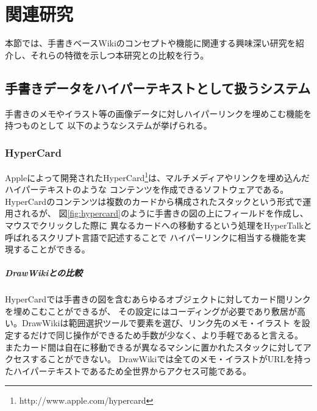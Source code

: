\chapter{関連研究}
\label{chap:kanren}

本節では、手書きベースWikiのコンセプトや機能に関連する興味深い研究を紹介し、それらの特徴を示しつ本研究との比較を行う。
\newpage


%

\section{手書きデータをハイパーテキストとして扱うシステム}
\label{hyperillustcreators}
手書きのメモやイラスト等の画像データに対しハイパーリンクを埋めこむ機能を持つものとして
以下のようなシステムが挙げられる。

\subsection{HyperCard}
Appleによって開発されたHyperCard\footnote{http://www.apple.com/hypercard}は、マルチメディアやリンクを埋め込んだハイパーテキストのような
コンテンツを作成できるソフトウェアである。
HyperCardのコンテンツは複数のカードから構成されたスタックという形式で運用されるが、
図\ref{fig:hypercard}のように手書きの図の上にフィールドを作成し、マウスでクリックした際に
異なるカードへの移動するという処理をHyperTalkと呼ばれるスクリプト言語で記述することで
ハイパーリンクに相当する機能を実現することができる。

\paragraph*{DrawWikiとの比較}
HyperCardでは手書きの図を含むあらゆるオブジェクトに対してカード間リンクを埋めこむことができるが、
その設定にはコーディングが必要であり敷居が高い。DrawWikiは範囲選択ツールで要素を選び、リンク先のメモ・イラスト
を設定するだけで同じ操作ができるため手数が少なく、より手軽であると言える。
またカード間は自在に移動できるが異なるマシンに置かれたスタックに対してアクセスすることができない。
DrawWikiでは全てのメモ・イラストがURLを持ったハイパーテキストであるため全世界からアクセス可能である。

